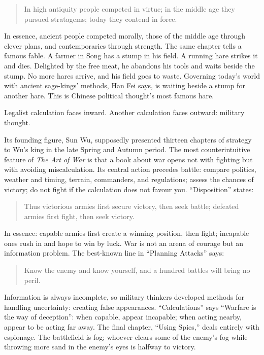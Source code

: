 \begin{quote}
In high antiquity people competed in virtue; in the middle age they pursued stratagems; today they contend in force.
\end{quote}
In essence, ancient people competed morally, those of the middle age through clever plans, and contemporaries through strength. The same chapter tells a famous fable. A farmer in Song has a stump in his field. A running hare strikes it and dies. Delighted by the free meat, he abandons his tools and waits beside the stump. No more hares arrive, and his field goes to waste. Governing today's world with ancient sage-kings' methods, Han Fei says, is waiting beside a stump for another hare. This is Chinese political thought's most famous hare.

Legalist calculation faces inward. Another calculation faces outward: military thought.

Its founding figure, Sun Wu, supposedly presented thirteen chapters of strategy to Wu's king in the late Spring and Autumn period. The most counterintuitive feature of \textit{The Art of War} is that a book about war opens not with fighting but with avoiding miscalculation. Its central action precedes battle: compare politics, weather and timing, terrain, commanders, and regulations; assess the chances of victory; do not fight if the calculation does not favour you. ``Disposition'' states:

\begin{quote}
Thus victorious armies first secure victory, then seek battle; defeated armies first fight, then seek victory.
\end{quote}
In essence: capable armies first create a winning position, then fight; incapable ones rush in and hope to win by luck. War is not an arena of courage but an information problem. The best-known line in ``Planning Attacks'' says:

\begin{quote}
Know the enemy and know yourself, and a hundred battles will bring no peril.
\end{quote}
Information is always incomplete, so military thinkers developed methods for handling uncertainty: creating false appearances. ``Calculations'' says ``Warfare is the way of deception'': when capable, appear incapable; when acting nearby, appear to be acting far away. The final chapter, ``Using Spies,'' deals entirely with espionage. The battlefield is fog; whoever clears some of the enemy's fog while throwing more sand in the enemy's eyes is halfway to victory.

